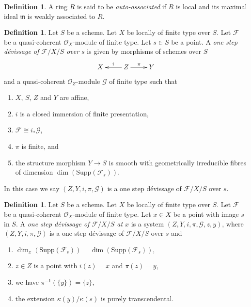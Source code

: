 \documentclass{amsart}
\theoremstyle{plain}
\theoremstyle{definition}
\newtheorem{definition}[subsection]{Definition}
\theoremstyle{remark}
\numberwithin{equation}{subsection}
\begin{document}
\begin{definition}
\label{more-algebra-definition-auto-ass}
A ring $R$ is said to be {\it auto-associated} if $R$ is local and its
maximal ideal $\mathfrak m$ is weakly associated to $R$.
\end{definition}

\begin{definition}
\label{definition-one-step-devissage}
Let $S$ be a scheme.
Let $X$ be locally of finite type over $S$.
Let $\mathcal{F}$ be a quasi-coherent $\mathcal{O}_X$-module of finite type.
Let $s \in S$ be a point.
A {\it one step d\'evissage of $\mathcal{F}/X/S$ over $s$}
is given by morphisms of schemes over $S$
$$
\xymatrix{
X & Z \ar[l]_i \ar[r]^\pi & Y
}
$$
and a quasi-coherent $\mathcal{O}_Z$-module $\mathcal{G}$ of finite type
such that
\begin{enumerate}
\item $X$, $S$, $Z$ and $Y$ are affine,
\item $i$ is a closed immersion of finite presentation,
\item $\mathcal{F} \cong i_*\mathcal{G}$,
\item $\pi$ is finite, and
\item the structure morphism $Y \to S$ is smooth with
geometrically irreducible fibres of
dimension $\dim(\text{Supp}(\mathcal{F}_s))$.
\end{enumerate}
In this case we say $(Z, Y, i, \pi, \mathcal{G})$ is a one step
d\'evissage of $\mathcal{F}/X/S$ over $s$.
\end{definition}

\begin{definition}
\label{definition-one-step-devissage-at-x}
Let $S$ be a scheme.
Let $X$ be locally of finite type over $S$.
Let $\mathcal{F}$ be a quasi-coherent $\mathcal{O}_X$-module of finite type.
Let $x \in X$ be a point with image $s$ in $S$.
A {\it one step d\'evissage of $\mathcal{F}/X/S$ at $x$}
is a system $(Z, Y, i, \pi, \mathcal{G}, z, y)$, where
$(Z, Y, i, \pi, \mathcal{G})$ is a one step d\'evissage of
$\mathcal{F}/X/S$ over $s$ and
\begin{enumerate}
\item $\dim_x(\text{Supp}(\mathcal{F}_s)) = \dim(\text{Supp}(\mathcal{F}_s))$,
\item $z \in Z$ is a point with $i(z) = x$ and $\pi(z) = y$,
\item we have $\pi^{-1}(\{y\}) = \{z\}$,
\item the extension $\kappa(y)/\kappa(s)$ is purely
transcendental.
\end{enumerate}
\end{definition}
\end{document}
